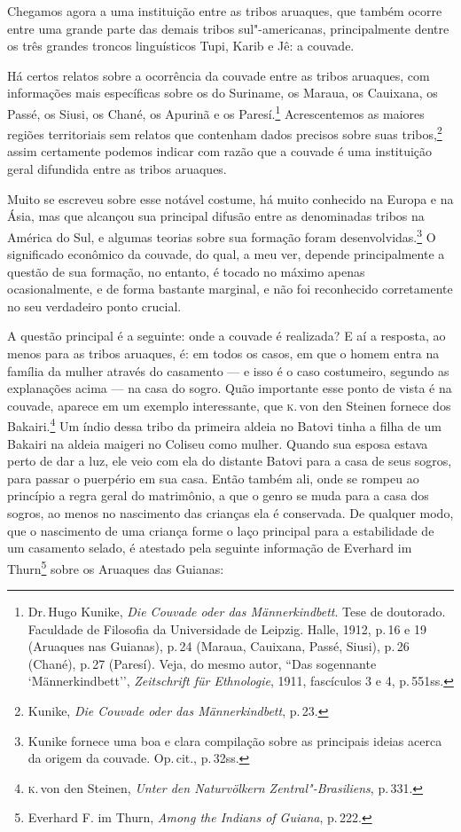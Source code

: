 Chegamos agora a uma instituição entre as tribos aruaques, que também
ocorre entre uma grande parte das demais tribos sul"-americanas,
principalmente dentre os três grandes troncos linguísticos Tupi, Karib
e Jê: a couvade.

Há certos relatos sobre a ocorrência da couvade entre as tribos aruaques,
com informações mais específicas sobre os do Suriname, os
Maraua, os Cauixana, os Passé, os Siusi, os Chané, os Apurinã e os
Paresí.\footnote{Dr.\,Hugo Kunike, \textit{Die Couvade oder das
  Männerkindbett}. Tese de doutorado. Faculdade de Filosofia da
  Universidade de Leipzig. Halle, 1912, p.\,16 e 19 (Aruaques nas
  Guianas), p.\,24 (Maraua, Cauixana, Passé, Siusi), p.\,26 (Chané), p.\,27
  (Paresí). Veja, do mesmo autor, ``Das sogennante `Männerkindbett'',
  \textit{Zeitschrift für Ethnologie}, 1911, fascículos 3 e 4, p.\,551ss.}
Acrescentemos as maiores regiões territoriais sem relatos que contenham
dados precisos sobre suas tribos,\footnote{Kunike, \textit{Die Couvade oder
  das Männerkindbett}, p.\,23.} assim certamente podemos indicar
com razão que a couvade é uma instituição geral difundida entre as
tribos aruaques.

Muito se escreveu sobre esse notável costume, há muito conhecido
na Europa e na Ásia, mas que alcançou sua principal difusão entre
as denominadas tribos na América do Sul, e algumas teorias sobre sua
formação foram desenvolvidas.\footnote{Kunike fornece uma boa e clara
  compilação sobre as principais ideias acerca da origem da couvade. Op.\,cit., p.\,32ss.} O significado econômico da couvade, do qual, a
meu ver, depende principalmente a questão de sua formação, no entanto, é tocado no
máximo apenas ocasionalmente, e de forma bastante marginal, e não foi
reconhecido corretamente no seu verdadeiro ponto crucial.

A questão principal é a seguinte: onde a couvade é realizada? E aí a
resposta, ao menos para as tribos aruaques, é: em todos os casos, em que
o homem entra na família da mulher através do casamento --- e isso é o
caso costumeiro, segundo as explanações acima --- na casa do sogro. Quão
importante esse ponto de vista é na couvade, aparece em um exemplo
interessante, que \textsc{k}.\,von den Steinen fornece dos Bakairi.\footnote{\textsc{k}.\,von den Steinen, \textit{Unter den Naturvölkern Zentral"-Brasiliens}, p.\,331.} Um índio dessa tribo da primeira aldeia no Batovi tinha a filha
de um Bakairi na aldeia maigeri no Coliseu como mulher. Quando sua
esposa estava perto de dar a luz, ele veio com ela do distante Batovi
para a casa de seus sogros, para passar o puerpério em sua casa. Então
também ali, onde se rompeu ao princípio a regra geral do matrimônio, a
que o genro se muda para a casa dos sogros, ao menos no nascimento das
crianças ela é conservada. De qualquer modo, que o nascimento de uma
criança forme o laço principal para a estabilidade de um casamento
selado, é atestado pela seguinte informação de Everhard im
Thurn\footnote{Everhard F. im Thurn, \textit{Among the Indians of Guiana},
  p.\,222.} sobre os Aruaques das Guianas: 

